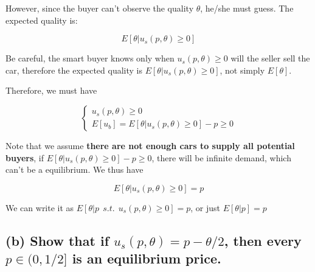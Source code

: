\documentclass{article}
\begin{document}
However, since the buyer can't observe the quality $\theta$, he/she must guess. The expected quality is:

$$E[\theta|u_s(p, \theta) \ge 0 ]$$

\begin{mdframed}[backgroundcolor=blue!20,linecolor=white]
Be careful, the smart buyer knows only when $u_s(p, \theta) \ge 0$ will the seller sell the car, therefore the expected
quality is $E[\theta|u_s(p, \theta) \ge 0 ]$, not simply $E[\theta]$. 
\end{mdframed}

Therefore, we must have 

\begin{equation}
    \begin{cases}
u_s(p, \theta) \ge 0 \\
E[u_b] = E[\theta|u_s(p, \theta) \ge 0 ] - p \ge 0
    \end{cases}
\nonumber
\end{equation}

Note that we assume \textbf{there are not enough cars to supply all potential buyers},
if $E[\theta|u_s(p, \theta) \ge 0 ] - p \ge 0$, there will be infinite demand, which can't be a equilibrium.
We thus have

$$E[\theta|u_s(p, \theta) \ge 0 ] = p$$

We can write it as $E[\theta|p \ \ s.t. \ \ u_s(p, \theta) \ge 0 ] = p$, or just $E[\theta|p] = p$

\subsection*{(b) Show that if $u_s(p, \theta) = p - \theta/2$, then every $p \in (0, 1/2]$ is an equilibrium price.}
\end{document}
